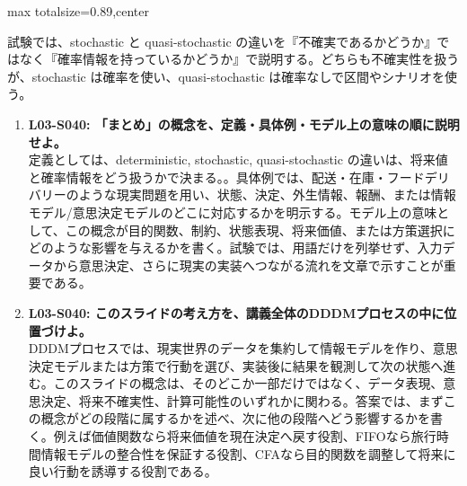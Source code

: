 \begin{minipage}[t]{0.58\textwidth}
\begin{adjustbox}{max totalsize={\textwidth}{0.89\textheight},center}
\begin{minipage}{\textwidth}
試験では、stochastic と quasi-stochastic の違いを『不確実であるかどうか』ではなく『確率情報を持っているかどうか』で説明する。どちらも不確実性を扱うが、stochastic は確率を使い、quasi-stochastic は確率なしで区間やシナリオを使う。\par{}\begin{enumerate}\item \textbf{L03-S040: 「まとめ」の概念を、定義・具体例・モデル上の意味の順に説明せよ。}\\定義としては、deterministic, stochastic, quasi-stochastic の違いは、将来値と確率情報をどう扱うかで決まる。。具体例では、配送・在庫・フードデリバリーのような現実問題を用い、状態、決定、外生情報、報酬、または情報モデル/意思決定モデルのどこに対応するかを明示する。モデル上の意味として、この概念が目的関数、制約、状態表現、将来価値、または方策選択にどのような影響を与えるかを書く。試験では、用語だけを列挙せず、入力データから意思決定、さらに現実の実装へつながる流れを文章で示すことが重要である。\item \textbf{L03-S040: このスライドの考え方を、講義全体のDDDMプロセスの中に位置づけよ。}\\DDDMプロセスでは、現実世界のデータを集約して情報モデルを作り、意思決定モデルまたは方策で行動を選び、実装後に結果を観測して次の状態へ進む。このスライドの概念は、そのどこか一部だけではなく、データ表現、意思決定、将来不確実性、計算可能性のいずれかに関わる。答案では、まずこの概念がどの段階に属するかを述べ、次に他の段階へどう影響するかを書く。例えば価値関数なら将来価値を現在決定へ戻す役割、FIFOなら旅行時間情報モデルの整合性を保証する役割、CFAなら目的関数を調整して将来に良い行動を誘導する役割である。\end{enumerate}
\end{minipage}
\end{adjustbox}
\end{minipage}


